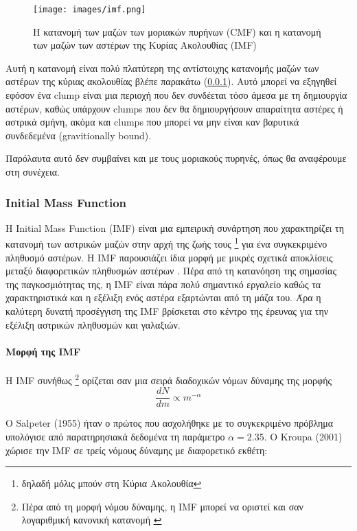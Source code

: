 \documentclass[a4paper,12pt]{memoir}
\begin{document}
\begin{figure}[hb]
	\centering
	\texttt{[image: images/imf.png]}
	\caption{Η κατανομή των μαζών των μοριακών πυρήνων (CMF) και η κατανομή των μαζών των αστέρων της Κυρίας Ακολουθίας (IMF) \cite{andre_2010}}
\end{figure}


Αυτή η κατανομή είναι πολύ πλατύτερη της αντίστοιχης κατανομής μαζών των αστέρων της κύριας ακολουθίας βλέπε παρακάτω (\ref{par:imf}). Αυτό μπορεί να εξηγηθεί εφόσον ένα clump είναι μια περιοχή που δεν συνδέεται τόσο άμεσα με τη δημιουργία αστέρων, καθώς υπάρχουν clumps που δεν θα δημιουργήσουν απαραίτητα αστέρες ή αστρικά σμήνη, ακόμα και clumps που μπορεί να μην είναι καν βαρυτικά συνδεδεμένα (gravitionally bound).

Παρόλαυτα αυτό δεν συμβαίνει και με τους μοριακούς πυρηνές, όπως θα αναφέρουμε στη συνέχεια. 

\subsubsection{Initial Mass Function}
\label{par:imf}
Η Initial Mass Function (IMF) είναι μια εμπειρική συνάρτηση που χαρακτηρίζει τη κατανομή των αστρικών μαζών στην αρχή της ζωής τους \footnote{δηλαδή μόλις μπούν στη Κύρια Ακολουθία} για ένα συγκεκριμένο πληθυσμό αστέρων. Η IMF παρουσιάζει ίδια μορφή με μικρές σχετικά αποκλίσεις μεταξύ διαφορετικών πληθυσμών αστέρων \cite{salpeter_initial_2005}.
Πέρα από τη κατανόηση της σημασίας της παγκοσμιότητας της, η IMF είναι πάρα πολύ σημαντικό εργαλείο καθώς τα χαρακτηριστικά και η εξέλιξη ενός αστέρα εξαρτώνται από τη μάζα του. 
Άρα η καλύτερη δυνατή προσέγγιση της IMF βρίσκεται στο κέντρο της έρευνας για την εξέλιξη αστρικών πληθυσμών και γαλαξιών.

\paragraph{Μορφή της IMF}
Η IMF συνήθως \footnote{Πέρα από τη μορφή νόμου δύναμης, η IMF μπορεί να οριστεί και σαν λογαριθμική κανονική κατανομή \cite{salpeter_initial_2005}} ορίζεται σαν μια σειρά διαδοχικών νόμων δύναμης της μορφής 
\begin{equation}
\frac{dN}{dm} \propto m^{-\alpha}
\end{equation}

Ο Salpeter (1955) ήταν ο πρώτος που ασχολήθηκε με το συγκεκριμένο πρόβλημα υπολόγισε από παρατηρησιακά δεδομένα τη παράμετρο $\alpha=2.35$.
Ο Kroupa (2001) χώρισε την IMF σε τρείς νόμους δύναμης με διαφορετικό εκθέτη:
\end{document}
